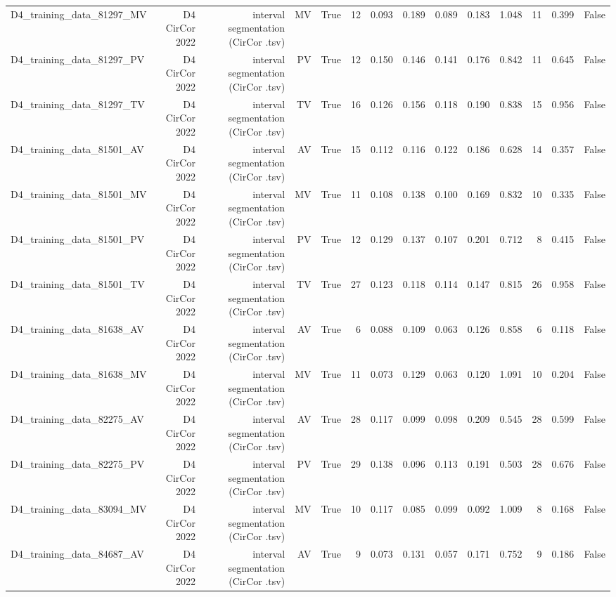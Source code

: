 \begin{table}[htbp]
\begin{tabular}{lrrrrrrrrrrrrr}
    D4\_training\_data\_81297\_MV & D4 CirCor 2022 & interval segmentation (CirCor .tsv) & MV & True & 12 & 0.093 & 0.189 & 0.089 & 0.183 & 1.048 & 11 & 0.399 & False \\
    D4\_training\_data\_81297\_PV & D4 CirCor 2022 & interval segmentation (CirCor .tsv) & PV & True & 12 & 0.150 & 0.146 & 0.141 & 0.176 & 0.842 & 11 & 0.645 & False \\
    D4\_training\_data\_81297\_TV & D4 CirCor 2022 & interval segmentation (CirCor .tsv) & TV & True & 16 & 0.126 & 0.156 & 0.118 & 0.190 & 0.838 & 15 & 0.956 & False \\
    D4\_training\_data\_81501\_AV & D4 CirCor 2022 & interval segmentation (CirCor .tsv) & AV & True & 15 & 0.112 & 0.116 & 0.122 & 0.186 & 0.628 & 14 & 0.357 & False \\
    D4\_training\_data\_81501\_MV & D4 CirCor 2022 & interval segmentation (CirCor .tsv) & MV & True & 11 & 0.108 & 0.138 & 0.100 & 0.169 & 0.832 & 10 & 0.335 & False \\
    D4\_training\_data\_81501\_PV & D4 CirCor 2022 & interval segmentation (CirCor .tsv) & PV & True & 12 & 0.129 & 0.137 & 0.107 & 0.201 & 0.712 & 8 & 0.415 & False \\
    D4\_training\_data\_81501\_TV & D4 CirCor 2022 & interval segmentation (CirCor .tsv) & TV & True & 27 & 0.123 & 0.118 & 0.114 & 0.147 & 0.815 & 26 & 0.958 & False \\
    D4\_training\_data\_81638\_AV & D4 CirCor 2022 & interval segmentation (CirCor .tsv) & AV & True & 6 & 0.088 & 0.109 & 0.063 & 0.126 & 0.858 & 6 & 0.118 & False \\
    D4\_training\_data\_81638\_MV & D4 CirCor 2022 & interval segmentation (CirCor .tsv) & MV & True & 11 & 0.073 & 0.129 & 0.063 & 0.120 & 1.091 & 10 & 0.204 & False \\
    D4\_training\_data\_82275\_AV & D4 CirCor 2022 & interval segmentation (CirCor .tsv) & AV & True & 28 & 0.117 & 0.099 & 0.098 & 0.209 & 0.545 & 28 & 0.599 & False \\
    D4\_training\_data\_82275\_PV & D4 CirCor 2022 & interval segmentation (CirCor .tsv) & PV & True & 29 & 0.138 & 0.096 & 0.113 & 0.191 & 0.503 & 28 & 0.676 & False \\
    D4\_training\_data\_83094\_MV & D4 CirCor 2022 & interval segmentation (CirCor .tsv) & MV & True & 10 & 0.117 & 0.085 & 0.099 & 0.092 & 1.009 & 8 & 0.168 & False \\
    D4\_training\_data\_84687\_AV & D4 CirCor 2022 & interval segmentation (CirCor .tsv) & AV & True & 9 & 0.073 & 0.131 & 0.057 & 0.171 & 0.752 & 9 & 0.186 & False \\

\end{tabular}
\end{table}

